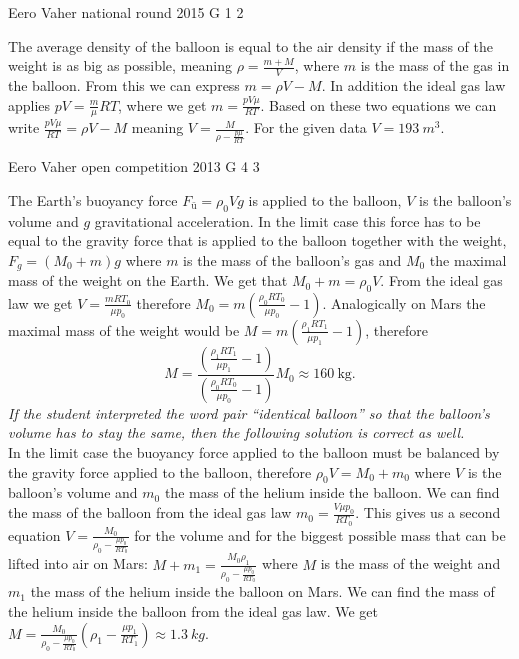 \documentclass[11pt]{article}
\begin{document}
{Eero Vaher} %
{national round} %
{2015} %
{G 1} %
{2} %
{

\ifEngSolution
The average density of the balloon is equal to the air density if the mass of the weight is as big as possible, meaning $\rho=\frac{m+M}{V}$, where $m$ is the mass of the gas in the balloon. From this we can express $m=\rho V-M$. In addition the ideal gas law applies $pV=\frac{m}{\mu}RT$, where we get $m=\frac{pV\mu}{RT}$. Based on these two equations we can write $\frac{pV\mu}{RT}=\rho V-M$ meaning $V=\frac{M}{\rho-\frac{p\mu}{RT}}$. For the given data $V=\SI{193}{m^3}$.
\fi
}

{Eero Vaher} %
{open competition} %
{2013} %
{G 4} %
{3} %
{

\ifEngSolution
The Earth’s buoyancy force $F_{ü}=\rho_0Vg$ is applied to the balloon, $V$ is the balloon’s volume and $g$ gravitational acceleration. In the limit case this force has to be equal to the gravity force that is applied to the balloon together with the weight, $F_g=(M_0+m)g$ where $m$ is the mass of the balloon’s gas and $M_0$ the maximal mass of the weight on the Earth. We get that $M_0+m=\rho_0V$. From the ideal gas law we get $V=\frac{mRT_0}{\mu p_0}$ therefore $M_0=m(\frac{\rho_0 RT_0}{\mu p_0}-1)$. Analogically on Mars the maximal mass of the weight would be $M=m(\frac{\rho_1RT_1}{\mu p_1}-1)$, therefore
\[M=\frac{(\frac{\rho_1RT_1}{\mu p_1}-1)}{(\frac{\rho_0RT_0}{\mu p_0}-1)}M_0\approx \SI{160}{\kilogram}.\] 
\emph{If the student interpreted the word pair “identical balloon” so that the balloon’s volume has to stay the same, then the following solution is correct as well.}\\
In the limit case the buoyancy force applied to the balloon must be balanced by the gravity force applied to the balloon, therefore $\rho_0 V=M_0+m_0$ where $V$ is the balloon’s volume and $m_0$ the mass of the helium inside the balloon. We can find the mass of the balloon from the ideal gas law $m_0=\frac{V\mu p_0}{RT_0}$. This gives us a second equation $V=\frac{M_0}{\rho_0-\frac{\mu p_0}{RT_0}}$ for the volume and for the biggest possible mass that can be lifted into air on Mars: $M+m_1=\frac{M_0\rho_1}{\rho_0-\frac{\mu p_0}{RT_0}}$ where $M$ is the mass of the weight and $m_1$ the mass of the helium inside the balloon on Mars. We can find the mass of the helium inside the balloon from the ideal gas law. We get $M=\frac{M_0}{\rho_0-\frac{\mu p_0}{RT_0}}(\rho_1-\frac{\mu p_1}{RT_1})\approx \SI{1,3}{kg}$.
\fi
}
\end{document}
